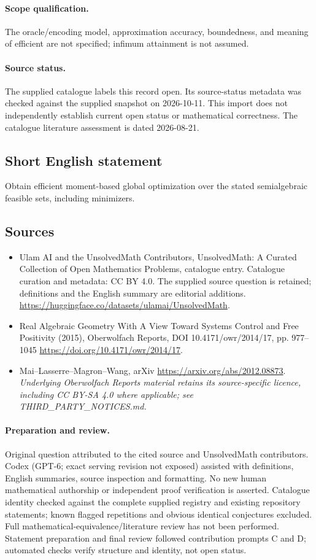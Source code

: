 \documentclass[11pt]{article}
\begin{document}
\paragraph{Scope qualification.}
The oracle/encoding model, approximation accuracy, boundedness, and meaning of efficient are not specified; infimum attainment is not assumed.
\paragraph{Source status.}
The supplied catalogue labels this record open. Its source-status metadata was checked against the supplied snapshot on 2026-10-11. This import does not independently establish current open status or mathematical correctness. The catalogue literature assessment is dated 2026-08-21.
\subsection{Short English statement}
Obtain efficient moment-based global optimization over the stated semialgebraic feasible sets, including minimizers.
\subsection{Sources}
\begin{itemize}
\item[S1] Ulam AI and the UnsolvedMath Contributors, UnsolvedMath: A Curated Collection of Open Mathematics Problems, catalogue entry. Catalogue curation and metadata: CC BY 4.0. The supplied source question is retained; definitions and the English summary are editorial additions.
\url{https://huggingface.co/datasets/ulamai/UnsolvedMath}.
\item[S2] Real Algebraic Geometry With A View Toward Systems Control and Free Positivity (2015), Oberwolfach Reports, DOI 10.4171/owr/2014/17, pp. 977--1045
\url{https://doi.org/10.4171/owr/2014/17}.
\item[S3] Mai--Lasserre--Magron--Wang, arXiv
\url{https://arxiv.org/abs/2012.08873}.
\textit{Underlying Oberwolfach Reports material retains its source-specific licence, including CC BY-SA 4.0 where applicable; see THIRD\_PARTY\_NOTICES.md.}
\end{itemize}
\paragraph{Preparation and review.}
Original question attributed to the cited source and UnsolvedMath contributors. Codex (GPT-6; exact serving revision not exposed) assisted with definitions, English summaries, source inspection and formatting. No new human mathematical authorship or independent proof verification is asserted. Catalogue identity checked against the complete supplied registry and existing repository statements; known flagged repetitions and obvious identical conjectures excluded. Full mathematical-equivalence/literature review has not been performed. Statement preparation and final review followed contribution prompts C and D; automated checks verify structure and identity, not open status.
\label{end:statement}
\end{document}
